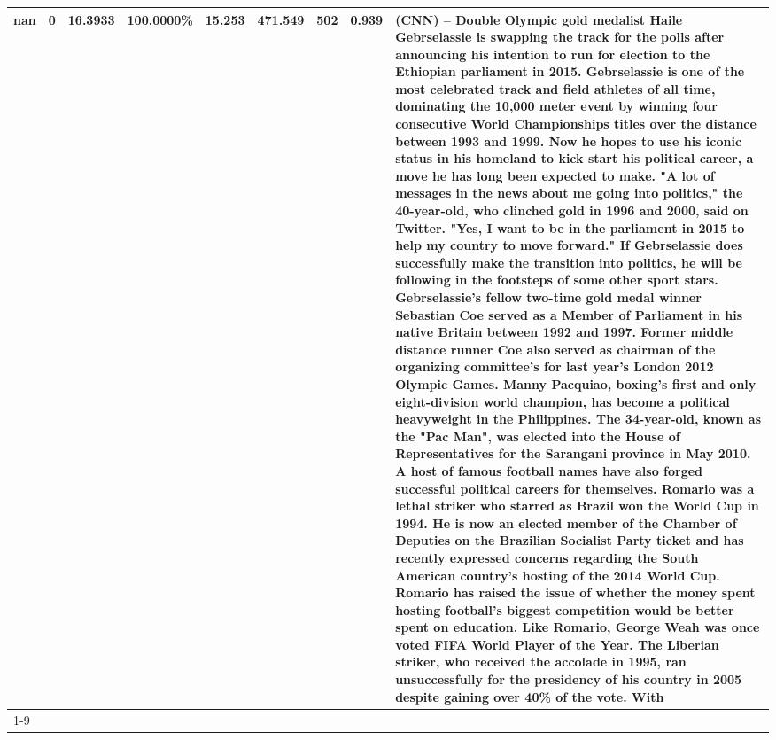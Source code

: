 \begin{table}[H]
{\begin{tabular}{lllrlllll}
\midrule
nan & 0 & \bfseries 16.3933 & \bfseries 100.0000\% & 15.253 & 471.549 & 502 & 0.939 & (CNN) -- Double Olympic gold medalist Haile Gebrselassie is swapping the track for the polls after announcing his intention to run for election to the Ethiopian parliament in 2015. Gebrselassie is one of the most celebrated track and field athletes of all time, dominating the 10,000 meter event by winning four consecutive World Championships titles over the distance between 1993 and 1999. Now he hopes to use his iconic status in his homeland to kick start his political career, a move he has long been expected to make. "A lot of messages in the news about me going into politics," the 40-year-old, who clinched gold in 1996 and 2000, said on Twitter. "Yes, I want to be in the parliament in 2015 to help my country to move forward." If Gebrselassie does successfully make the transition into politics, he will be following in the footsteps of some other sport stars. Gebrselassie's fellow two-time gold medal winner Sebastian Coe served as a Member of Parliament in his native Britain between 1992 and 1997. Former middle distance runner Coe also served as chairman of the organizing committee's for last year's London 2012 Olympic Games. Manny Pacquiao, boxing's first and only eight-division world champion, has become a political heavyweight in the Philippines. The 34-year-old, known as the "Pac Man", was elected into the House of Representatives for the Sarangani province in May 2010. A host of famous football names have also forged successful political careers for themselves. Romario was a lethal striker who starred as Brazil won the World Cup in 1994. He is now an elected member of the Chamber of Deputies on the Brazilian Socialist Party ticket and has recently expressed concerns regarding the South American country's hosting of the 2014 World Cup. Romario has raised the issue of whether the money spent hosting football's biggest competition would be better spent on education. Like Romario, George Weah was once voted FIFA World Player of the Year. The Liberian striker, who received the accolade in 1995, ran unsuccessfully for the presidency of his country in 2005 despite gaining over 40\% of the vote. With \\
\cline{1-9}

\end{tabular}}
\end{table}

